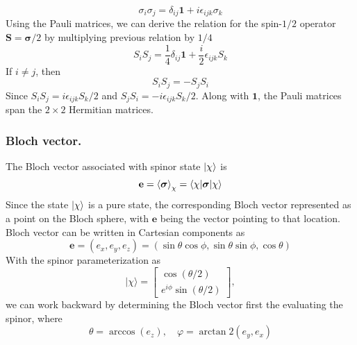 \documentclass[../../../main.tex]{subfiles}
\begin{document}
\begin{equation*}
    \sigma_i \sigma_j = \delta_{ij} \mathbf{1} + i \epsilon_{ijk} \sigma_k
\end{equation*}
Using the Pauli matrices, we can derive the relation for the spin-$1/2$ operator $\mathbf{S} = \boldsymbol{\sigma}/2$ by multiplying previous relation by $1/4$
\begin{equation*}
    S_iS_j= \frac{1 }{4 }\delta_{ij}\mathbf{1} +\frac{i }{2} \epsilon_{ijk }S_k
\end{equation*}
If $i\neq j$, then
\begin{equation*}
    S_iS_j = -S_jS_i
\end{equation*}
Since $S_iS_j = i\epsilon_{ijk }S_k/2$ and $S_jS_i= -i \epsilon_{ijk }S_k/2$.
Along with $\mathbf{1}$, the Pauli matrices span the $2 \times  2$ Hermitian matrices.

\subsubsection{Bloch vector.}
The Bloch vector associated with spinor state $\ket{\chi}$ is
\begin{equation*}
    \mathbf{e }= \braket{\boldsymbol{\sigma}  }_{\chi}= \braket{\chi  | \boldsymbol{\sigma }|\chi}
\end{equation*}
Since the state $\ket{\chi}$ is a pure state, the corresponding Bloch vector represented as a point on the Bloch sphere, with $\mathbf{e}$ being the vector pointing to that location.
Bloch vector can be written in Cartesian components as
\begin{equation*}
    \mathbf{e} = (e_x,e_y,e_z) = (\sin \theta \cos \phi, \sin \theta \sin \phi, \cos \theta)
\end{equation*}
With the spinor parameterization as
\begin{equation*}
    |\chi\rangle = \begin{bmatrix}
        \cos(\theta/2) \\
        e^{i\phi} \sin(\theta/2)
    \end{bmatrix},
\end{equation*}
we can work backward by determining the Bloch vector first the evaluating the spinor, where
\begin{equation*}
    \theta = \arccos(e_z), \quad \varphi = \arctan2(e_y, e_x)
\end{equation*}
\end{document}
